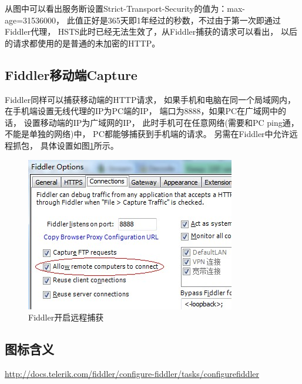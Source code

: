 \documentclass{book}
\begin{document}
从图中可以看出服务断设置Strict-Transport-Security的值为：max-age=31536000，
此值正好是365天即1年经过的秒数，不过由于第一次即通过Fiddler代理，
HSTS此时已经无法生效了，从Fiddler捕获的请求可以看出，
以后的请求都使用的是普通的未加密的HTTP。

\subsection{Fiddler移动端Capture}

Fiddler同样可以捕获移动端的HTTP请求，
如果手机和电脑在同一个局域网内，
在手机端设置无线代理的IP为PC端的IP，
端口为8888，如果PC在广域网中的话，
设置移动端的IP为广域网的IP，
此时手机可在任意网络(需要和PC ping通，不能是单独的网络)中，
PC都能够捕获到手机端的请求。
另需在Fiddler中允许远程抓包，
具体设置如图\ref{fig:FiddlerCaptureMobilePackage}所示。

\begin{figure}[htbp]
	\centering
	\includegraphics[scale=0.5]{FiddlerCaptureMobilePackage.jpg}
	\caption{Fiddler开启远程捕获}
	\label{fig:FiddlerCaptureMobilePackage}
\end{figure}


\subsection{图标含义}

\url{http://docs.telerik.com/fiddler/configure-fiddler/tasks/configurefiddler}
\end{document}
